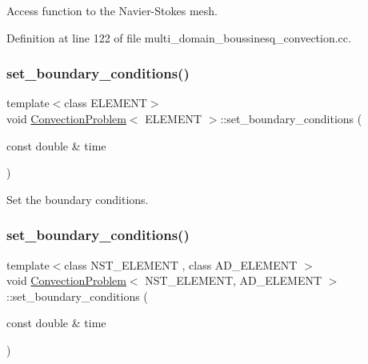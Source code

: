 Access function to the Navier-\/\+Stokes mesh. 



Definition at line 122 of file multi\+\_\+domain\+\_\+boussinesq\+\_\+convection.\+cc.

\mbox{\label{classConvectionProblem_a3b2e60458eead30fb143002a631683b7}} 
\subsubsection{\texorpdfstring{set\+\_\+boundary\+\_\+conditions()}{set\_boundary\_conditions()}\hspace{0.1cm}{\footnotesize\ttfamily [1/2]}}
{\footnotesize\ttfamily template$<$class E\+L\+E\+M\+E\+NT$>$ \\
void \hyperlink{classConvectionProblem}{Convection\+Problem}$<$ E\+L\+E\+M\+E\+NT $>$\+::set\+\_\+boundary\+\_\+conditions (\begin{DoxyParamCaption}\item[{const double \&}]{time }\end{DoxyParamCaption})}



Set the boundary conditions. 

\mbox{\label{classConvectionProblem_a605543718d51f7a77f75a46b48b543d7}} 
\subsubsection{\texorpdfstring{set\+\_\+boundary\+\_\+conditions()}{set\_boundary\_conditions()}\hspace{0.1cm}{\footnotesize\ttfamily [2/2]}}
{\footnotesize\ttfamily template$<$class N\+S\+T\+\_\+\+E\+L\+E\+M\+E\+NT , class A\+D\+\_\+\+E\+L\+E\+M\+E\+NT $>$ \\
void \hyperlink{classConvectionProblem}{Convection\+Problem}$<$ N\+S\+T\+\_\+\+E\+L\+E\+M\+E\+NT, A\+D\+\_\+\+E\+L\+E\+M\+E\+NT $>$\+::set\+\_\+boundary\+\_\+conditions (\begin{DoxyParamCaption}\item[{const double \&}]{time }\end{DoxyParamCaption})}



